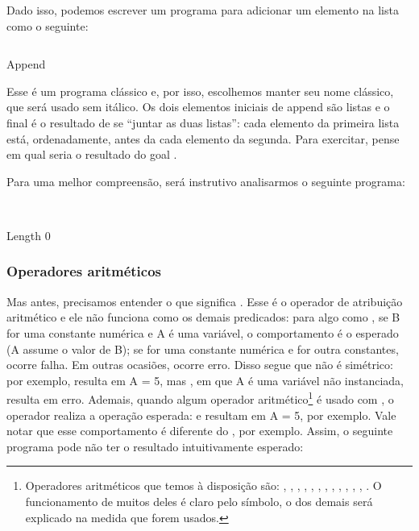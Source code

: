 Dado isso, podemos escrever um programa para adicionar um elemento na
lista como o seguinte:

\begin{listing}[ht]
  \inputminted{prolog}{../Exemplos/Cap2/prog2_append.pl}
  \caption{Append}\label{lst:append}
\end{listing}

Esse é um programa clássico e, por isso, escolhemos manter seu nome
clássico, que será usado sem itálico. Os dois
elementos iniciais de append são listas e o final é o resultado de se
``juntar as duas listas'': cada elemento da primeira lista está,
ordenadamente, antes da cada elemento da segunda. Para exercitar,
pense em qual seria o resultado do goal .

Para uma melhor compreensão, será instrutivo analisarmos o seguinte
programa: \\ \\

    \begin{listing}
\inputminted{prolog}{../Exemplos/Cap3/prog2_length.pl}
\caption{Length 0}\label{lst:length}
    \end{listing}

\subsubsection{Operadores aritméticos}

Mas antes, precisamos entender o que significa . Esse  é o operador de atribuição aritmético e ele
não funciona como os demais predicados: para algo como , se B for uma constante numérica e A é uma variável, o
comportamento é o esperado (A assume o valor de B); se  for uma
constante numérica e  for outra constantes, ocorre falha. Em
outras ocasiões, ocorre erro.  Disso segue que  não é
simétrico: por exemplo,  resulta em A = 5, mas
, em que A é uma variável não instanciada, resulta em
erro. Ademais, quando algum operador aritmético\footnote{Operadores
  aritméticos que temos à disposição são: , ,
  , , , ,
  , , , ,
  , , . O funcionamento de
  muitos deles é claro pelo símbolo, o dos demais será explicado na
  medida que forem usados.}  é usado com ,
o operador realiza a operação esperada:  e
 resultam em A = 5, por exemplo. Vale notar que
esse comportamento é diferente do , por exemplo. Assim, o
seguinte programa pode não ter o resultado intuitivamente esperado:

